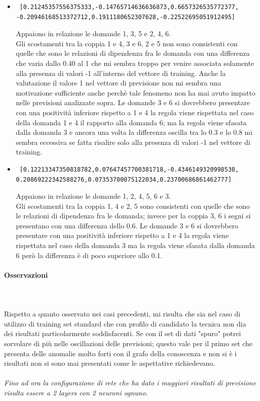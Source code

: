 \begin{itemize}
\item \begin{verbatim} [0.21245357556375333,-0.14765714636636873,0.6657326535772377,
-0.20946168513372712,0.1911180652307628,-0.22522695051912495]
\end{verbatim}
Appaiono in relazione le domande 1, 3, 5  e 2, 4, 6.\\
Gli scostamenti tra la coppia 1 e 4, 3 e 6, 2 e 5 non sono consistenti con quelle che sono le relazioni di dipendenza fra le domanda con una differenza che varia dallo 0.40 al 1 che mi sembra troppo per venire associata solamente alla presenza di valori -1 all'interno del vettore di training. Anche la valutazione il valore 1 nel vettore di previsione non mi sembra una motivazione sufficiente anche perch\`e tale fenomeno non ha mai avuto impatto nelle previsioni analizzate sopra.
Le domande 3 e 6 si dovrebbero presentare con una positivit\`a inferiore rispetto a 1 e 4 la regola viene rispettata nel caso della domanda 1 e 4 il rapporto alla domanda 6; ma la regola viene sfasata dalla domanda 3 e ancora una volta la differenza oscilla tra lo 0.3 e lo 0.8 mi sembra eccessiva se fatta risalire solo alla presenza di valori -1 nel vettore di training.


\item \begin{verbatim} [0.12213347350818782,0.07647457700381718,-0.4346149320998538,
0.20869222342588276,0.07353700075122034,0.23700686861462777]
\end{verbatim}
Appaiono in relazione le domande 1, 2, 4, 5, 6 e 3.\\
Gli scostamenti tra la coppia 1, 4 e 2, 5 sono consistenti con quelle che sono le relazioni di dipendenza fra le domanda; invece per la coppia 3, 6 i segni si presentano con una differenza dello 0.6.
Le domande 3 e 6 si dovrebbero presentare con una positivit\`a inferiore rispetto a 1 e 4 la regola viene rispettata nel caso della domanda 3 ma la regola viene sfasata dalla domanda 6 per\`o la differenza \`e di poco superiore allo 0.1.
\end{itemize}

\paragraph{Osservazioni}\mbox{}
\label{Osservazioni su rete a 4 neuroni per 1 layers}
\\\\
\noindent
Rispetto a quanto osservato nei casi precedenti, mi risulta che sia nel caso di utilizzo di training set standard che con profilo di candidato la tecnica non dia dei risultati particolarmente soddisfacenti. Se con il set di dati "spuro" potrei sorvolare di pi\`u nelle oscillazioni delle previsioni; questo vale per il primo set che presenta delle anomalie molto forti con il grafo della conoscenza e non si \`e i risultati non si sono mai presentati come le aspettative richiedevano.
\\\\
\noindent
\textit{Fino ad ora la configurazione di rete che ha dato i maggiori risultati di previsione risulta essere a 2 layers con 2 neuroni ognuno.}



